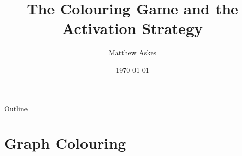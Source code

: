 \documentclass{beamer}
\title[The Colouring Game and the Activ. Strat.]{The Colouring Game and the Activation Strategy}
\author{Matthew Askes}
\institute[Victoria University]{Victoria University of Wellington}
\date{\today}
\begin{document}
\frame{\titlepage}


\begin{frame}{Outline}
    \tableofcontents
\end{frame}

\section{Graph Colouring}


%      
%             
%            
%    
\end{document}
